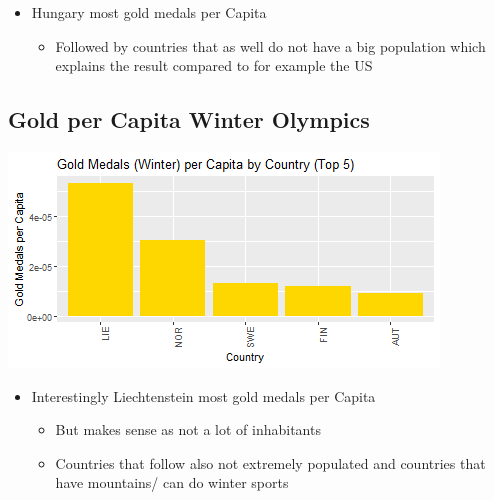\documentclass[11pt,preprint, authoryear]{elsarticle}
\let\origfigure\figure
\let\endorigfigure\endfigure
\renewenvironment{figure}[1][2] {
    \expandafter\origfigure\expandafter[H]
} {
    \endorigfigure
}
\numberwithin{equation}{section}
\numberwithin{figure}{section}
\numberwithin{table}{section}
\def\tightlist{} %
\begin{document}
\begin{itemize}
\tightlist
\item
  Hungary most gold medals per Capita

  \begin{itemize}
  \tightlist
  \item
    Followed by countries that as well do not have a big population
    which explains the result compared to for example the US
  \end{itemize}
\end{itemize}

\hypertarget{gold-per-capita-winter-olympics}{%
\subsection{Gold per Capita Winter
Olympics}\label{gold-per-capita-winter-olympics}}

\begin{figure}[H]

{\centering \includegraphics{Question4_files/figure-latex/Figure5-1} 

}

\caption{Gold per Capita Winter Olympics \label{Figure5}}\label{fig:Figure5}
\end{figure}

\begin{itemize}
\tightlist
\item
  Interestingly Liechtenstein most gold medals per Capita

  \begin{itemize}
  \tightlist
  \item
    But makes sense as not a lot of inhabitants
  \item
    Countries that follow also not extremely populated and countries
    that have mountains/ can do winter sports
  \end{itemize}
\end{itemize}
\end{document}

